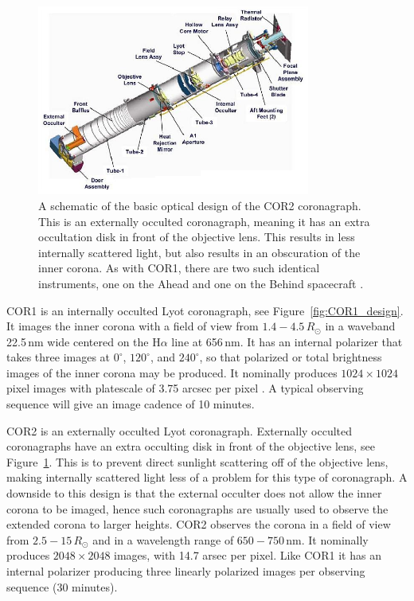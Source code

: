 \begin{figure}[!t]
\begin{center}
\includegraphics[width=0.8\textwidth]{images/cor2}
\caption[The COR2 coronagraph]{A schematic of the basic optical design of the COR2 coronagraph. This is an externally occulted coronagraph, meaning it has an extra occultation disk in front of the objective lens. This results in less internally scattered light, but also results in an obscuration of the inner corona. As with COR1, there are two such identical instruments, one on the Ahead and one on the Behind spacecraft \citep{how08}.}
\label{fig:cor2}
\end{center}
\end{figure}


COR1 is an internally occulted Lyot coronagraph, see Figure~\ref{fig:COR1_design}. It images the inner corona with a field of view from $1.4 - 4.5\,R_{\odot}$ in a waveband 22.5\,nm wide centered on the H$\alpha$ line at 656\,nm. It has an internal polarizer that takes three images at $0^{\circ}$, $120^{\circ}$, and $240^{\circ}$, so that polarized or total brightness images of the inner corona may be produced. It nominally produces $1024\times1024$ pixel images with platescale of 3.75 arcsec per pixel \citep{thomp2008}. A typical observing sequence will give an image cadence of 10 minutes.

COR2 is an externally occulted Lyot coronagraph. Externally occulted coronagraphs have an extra occulting disk in front of the objective lens, see Figure~\ref{fig:cor2}. This is to prevent direct sunlight scattering off of the objective lens, making internally scattered light less of a problem for this type of coronagraph. A downside to this design is that the external occulter does not allow the inner corona to be imaged, hence such coronagraphs are usually used to observe the extended corona to larger heights. COR2 observes the corona in a field of view from $2.5 - 15\,R_{\odot}$ and in a wavelength range of $650 - 750$\,nm. It nominally produces $2048\times2048$ images, with 14.7 arsec per pixel. Like COR1 it has an internal polarizer producing three linearly polarized images per observing sequence (30 minutes).

